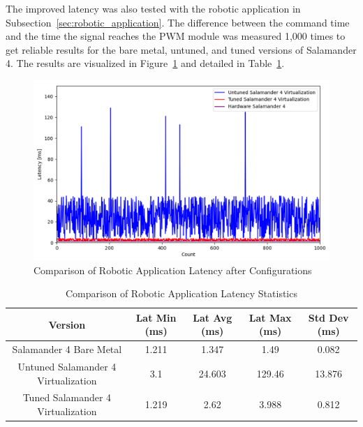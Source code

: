 \documentclass[MMR,Master,english]{style/twbook}
\begin{document}
\clearpage

\noindent The improved latency was also tested with the robotic application in Subsection~\ref{sec:robotic_application}. The difference between the command time and the time the signal reaches the PWM module was measured 1,000 times to get reliable results for the bare metal, untuned, and tuned versions of Salamander 4. The results are visualized in Figure~\ref{fig:combined_latencies} and detailed in Table~\ref{tab:robotic_application_latency_values_combined}.

\begin{figure}[H]
	\centering
	\includegraphics[width=1.0\columnwidth]{img/results/combined_latencies.png}
	\caption{Comparison of Robotic Application Latency after Configurations}
	\label{fig:combined_latencies}
\end{figure}

\begin{table}[H]
	\small
	\centering
	\caption{Comparison of Robotic Application Latency Statistics}
	\label{tab:robotic_application_latency_values_combined}
	\setlength{\tabcolsep}{0.5em} %
	{\renewcommand{\arraystretch}{1.2}%
		\begin{tabular}{|c|c|c|c|c|}
			\hline
			\textbf{Version}        & \textbf{Lat Min (ms)} & \textbf{Lat Avg (ms)} & \textbf{Lat Max (ms)} & \textbf{Std Dev (ms)} \\ \hline
			Salamander 4 Bare Metal              & 1.211                 & 1.347                 & 1.49                  & 0.082                 \\ \hline
			Untuned Salamander 4 Virtualization & 3.1                   & 24.603                & 129.46                & 13.876                \\ \hline
			Tuned Salamander 4 Virtualization   & 1.219                 & 2.62                  & 3.988                 & 0.812                 \\ \hline
		\end{tabular}}
\end{table}
\end{document}
